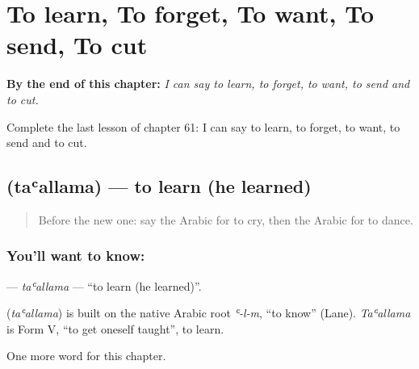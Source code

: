 
\chapter{To learn, To forget, To want, To send, To cut}
\label{ch:ar-to-learn-to-forget-to-want-to-send-to-cut}

\begin{chapteropening}
\textbf{By the end of this chapter:} \emph{I can say to learn, to forget, to want, to send and to cut.}

Complete the last lesson of chapter 61: I can say to learn, to forget, to want, to send and to cut.
\end{chapteropening}

\section[\texorpdfstring{\ar{تعلم} (taʿallama)}{تعلم (taʿallama)}]{ (taʿallama) — to learn (he learned)}

\label{lesson:AR-C61-taallama}



\begin{quote}
Before the new one: say the Arabic for to cry, then the Arabic for to dance.
\end{quote}

\subsection*{You'll want to know: }
\textbf{} — \emph{taʿallama} — \textquotedblleft{}to learn (he learned)\textquotedblright{}.

\begin{cousinweb}
\textbf{} (\emph{taʿallama}) is built on the native Arabic root \emph{ʿ-l-m}, \textquotedblleft{}to know\textquotedblright{} (Lane). \emph{Taʿallama} is Form V, \textquotedblleft{}to get oneself taught\textquotedblright{}, to learn.
\end{cousinweb}

\begin{grammarlens}[title={What you've built}]
One more word for this chapter.
\end{grammarlens}

